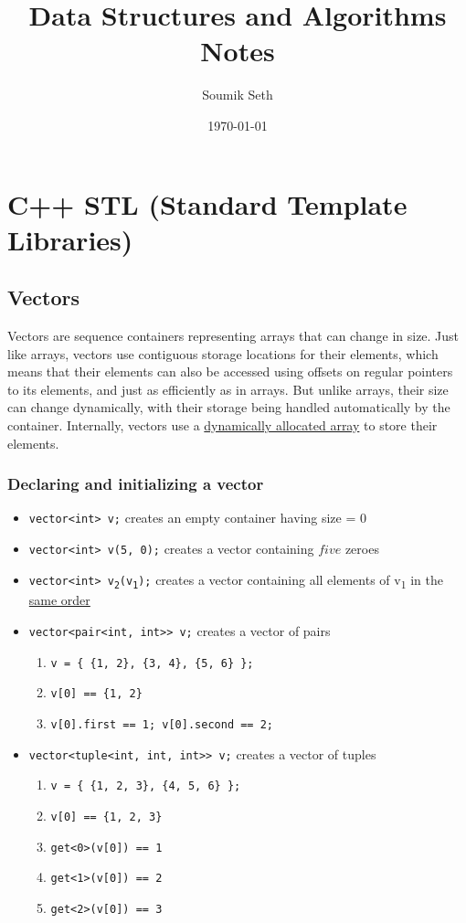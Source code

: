 \documentclass[a4paper, 12pt]{book}
\title{Data Structures and Algorithms Notes}
\author{Soumik Seth}
\date{\today}
\begin{document}
	
	\maketitle
	\tableofcontents
	
	\chapter{C++ STL (Standard Template Libraries)}
	\section{Vectors}
	
		Vectors are sequence containers representing arrays that can change in size.	
		Just like arrays, vectors use contiguous storage locations for their elements, which means that their elements can also be accessed using offsets on regular pointers to its elements, and just as efficiently as in arrays. But unlike arrays, their size can change dynamically, with their storage being handled automatically by the container. Internally, vectors use a \underline{dynamically allocated array} to store their elements.
	
	\subsection{Declaring and initializing a vector} 
	\begin{itemize}
		\item \texttt{vector<int> v;} creates an empty container having size = 0
		\item \texttt{vector<int> v(5, 0);} creates a vector containing $five$ zeroes
		\item \texttt{vector<int> v\textsubscript{2}(v\textsubscript{1});} creates a vector containing all elements of v\textsubscript{1} in the \underline{same order}
		\item \texttt{vector<pair<int, int>> v;} creates a vector of pairs
			\begin{enumerate}
				\item \texttt{v = \{ \{1, 2\}, \{3, 4\}, \{5, 6\} \};}
				\item \texttt{v[0] == \{1, 2\}}
				\item \texttt{v[0].first == 1; v[0].second == 2;}
			\end{enumerate}
		\item \texttt{vector<tuple<int, int, int>> v;} creates a vector of tuples
			\begin{enumerate}
				\item \texttt{v = \{ \{1, 2, 3\}, \{4, 5, 6\} \};}
				\item \texttt{v[0] == \{1, 2, 3\}}
				\item \texttt{get<0>(v[0]) == 1}
				\item \texttt{get<1>(v[0]) == 2}
				\item \texttt{get<2>(v[0]) == 3}
			\end{enumerate}
		
	\end{itemize}
	\newpage
	
\end{document}
